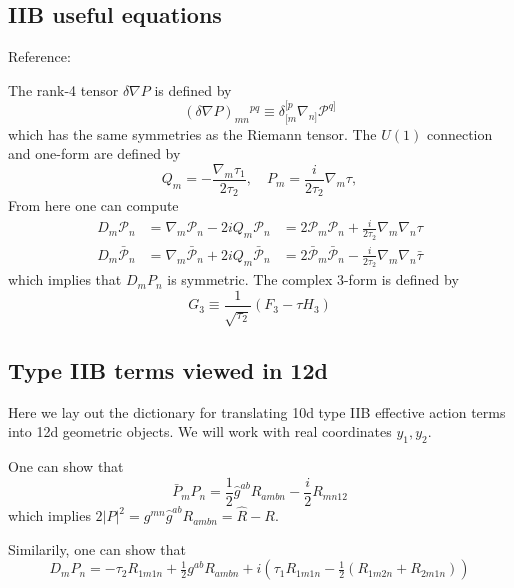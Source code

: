 \subsection{IIB useful equations}

Reference: \cite{Policastro:2008hg,Minasian:2015bxa}

The rank-4 tensor $\delta \nabla P$ is defined by
\begin{equation}
(\delta \nabla P)_{mn}{}^{pq} \equiv 
\delta_{[m}^{[p} \nabla_{n]}\mathcal{P}^{q]}
\end{equation}
which has the same symmetries as the Riemann tensor.
The $U(1)$ connection and one-form are defined by
\begin{equation}
Q_m =-\frac{\nabla_m\tau_1}{2\tau_2},\quad
P_m = \frac{i}{2\tau_2} \nabla_m \tau,
\end{equation}
From here one can compute
\begin{equation}
\begin{aligned}
D_m \mathcal{P}_n
&= \nabla_m \mathcal{P}_n - 2i Q_m \mathcal{P}_n
&= 2\mathcal{P}_m \mathcal{P}_n + \frac{i}{2\tau_2} \nabla_m \nabla_n \tau \\
D_m \bar{\mathcal{P}}_n
&= \nabla_m \bar{\mathcal{P}}_n + 2i Q_m \bar{\mathcal{P}}_n
&= 2\bar{\mathcal{P}}_m \bar{\mathcal{P}}_n - \frac{i}{2\tau_2} \nabla_m \nabla_n \bar{\tau}
\end{aligned}
\end{equation}
which implies that $D_m P_n$ is symmetric.
The complex 3-form is defined by
\begin{equation}
G_3 \equiv \frac{1}{\sqrt{\tau_2}} (F_3 - \tau H_3)
\end{equation}

\subsection{Type IIB terms viewed in 12d}
Here we lay out the dictionary for translating 10d type IIB effective action terms into 12d geometric objects. We will work with real coordinates $y_1, y_2$.

One can show that
\begin{equation}
\bar{P}_m P_n = \frac{1}{2} \hat{g}^{ab} R_{ambn} - \frac{i}{2} R_{mn12}
\end{equation}
which implies $2|P|^2 = g^{mn}\hat{g}^{ab} R_{ambn} = \hat{R} - R$.

Similarily, one can show that
\begin{equation}
D_m P_n = -\tau_2 R_{1m1n} + \tfrac{1}{2} g^{ab} R_{ambn} + i \left( \tau_1  R_{1m1n} - \tfrac{1}{2}(R_{1m2n} + R_{2m1n}) \right)
\end{equation}

